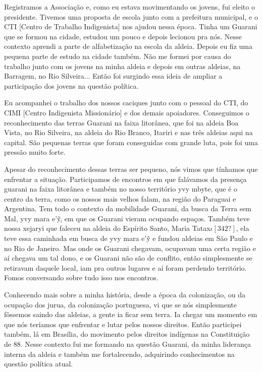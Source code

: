 \documentclass{article}
\begin{document}
Registramos a Associa\c{c}\~ao e, como eu estava movimentando os jovens,
fui eleito o presidente. Tivemos uma proposta de escola junto com a
prefeitura municipal, e o CTI [Centro de Trabalho Indigenista] nos
ajudou nessa \'epoca. Tinha um Guarani que se formou na cidade, estudou
um pouco e depois lecionou pra n\'os. Nesse contexto aprendi a parte de
alfabetiza\c{c}\~ao na escola da aldeia. Depois eu fiz uma pequena
parte de estudo na cidade tamb\'em. N\~ao me formei por causa do
trabalho junto com os jovens na minha aldeia e depois em outras
aldeias, na Barragem, no Rio Silveira... Ent\~ao foi surgindo essa
ideia de ampliar a participa\c{c}\~ao dos jovens na quest\~ao
pol\'itica.

Eu acompanhei o trabalho dos nossos caciques junto com o pessoal do CTI,
do CIMI [Centro Indigenista Mission\'ario] e dos demais apoiadores.
Conseguimos o reconhecimento das terras Guarani na faixa litor\^anea,
que foi na aldeia Boa Vista, no Rio Silveira, na aldeia do Rio Branco,
Itariri e nas tr\^es aldeias aqui na capital. S\~ao pequenas terras que
foram conseguidas com grande luta, pois foi uma press\~ao muito forte. 

Apesar do reconhecimento dessas terras ser pequeno, n\'os vimos que
t\'inhamos que enfrentar a situa\c{c}\~ao. Participamos de encontros em
que fal\'avamos da presen\c{c}a guarani na faixa litor\^anea e tamb\'em
no nosso territ\'orio yvy mbyte, que \'e o centro da terra, como os
nossos mais velhos falam, na regi\~ao do Paraguai e Argentina. Tem todo
o contexto da mobilidade Guarani, da busca da Terra sem Mal, yvy mara
e{\textquoteright}\~{y}, em que os Guarani vieram ocupando espa\c{c}os.
Tamb\'em teve nossa xejaryi que faleceu na aldeia do Esp\'irito Santo,
Maria Tatax$\iota [342?]$, ela teve essa caminhada em busca de yvy mara
e{\textquoteright}\~{y} e fundou aldeias em S\~ao Paulo e no Rio de
Janeiro. Mas onde os Guarani chegavam, ocupavam uma certa regi\~ao e
a\'i chegava um tal dono, e os Guarani n\~ao s\~ao de conflito, ent\~ao
simplesmente se retiravam daquele local, iam pra outros lugares e a\'i
foram perdendo territ\'orio. Fomos conversando sobre tudo isso nos
encontros.

Conhecendo mais sobre a minha hist\'oria, desde a \'epoca da
coloniza\c{c}\~ao, ou da ocupa\c{c}\~ao dos jurua, da coloniza\c{c}\~ao
portuguesa, vi que se n\'os simplesmente f\^ossemos saindo das aldeias,
a gente ia ficar sem terra. Ia chegar um momento em que n\'os
ter\'iamos que enfrentar e lutar pelos nossos direitos. Ent\~ao
participei tamb\'em, l\'a em Bras\'ilia, do movimento pelos direitos
ind\'igenas na Constitui\c{c}\~ao de 88. Nesse contexto fui me formando
na quest\~ao Guarani, da minha lideran\c{c}a interna da aldeia e
tamb\'em me fortalecendo, adquirindo conhecimentos na quest\~ao
pol\'itica atual.
\end{document}
